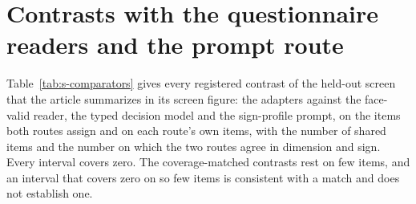 \documentclass[12pt]{article}
\begin{document}
\section{Contrasts with the questionnaire readers and the prompt route}\label{sec:s-contrasts}

Table~\ref{tab:s-comparators} gives every registered contrast of the held-out screen that the article summarizes in its screen figure: the adapters against the face-valid reader, the typed decision model and the sign-profile prompt, on the items both routes assign and on each route's own items, with the number of shared items and the number on which the two routes agree in dimension and sign. Every interval covers zero. The coverage-matched contrasts rest on few items, and an interval that covers zero on so few items is consistent with a match and does not establish one.
\end{document}
